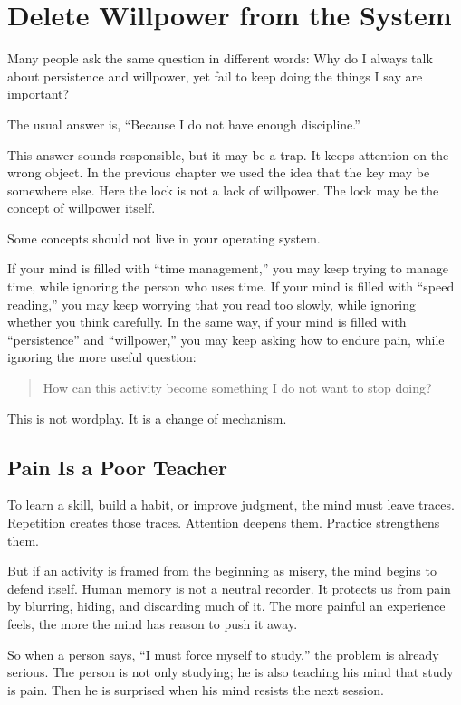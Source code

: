 \chapter{Delete Willpower from the System}

Many people ask the same question in different words: Why do I always talk about persistence and willpower, yet fail to keep doing the things I say are important?

The usual answer is, ``Because I do not have enough discipline.''

This answer sounds responsible, but it may be a trap. It keeps attention on the wrong object. In the previous chapter we used the idea that the key may be somewhere else. Here the lock is not a lack of willpower. The lock may be the concept of willpower itself.

Some concepts should not live in your operating system.

If your mind is filled with ``time management,'' you may keep trying to manage time, while ignoring the person who uses time. If your mind is filled with ``speed reading,'' you may keep worrying that you read too slowly, while ignoring whether you think carefully. In the same way, if your mind is filled with ``persistence'' and ``willpower,'' you may keep asking how to endure pain, while ignoring the more useful question:

\begin{quote}
How can this activity become something I do not want to stop doing?
\end{quote}

This is not wordplay. It is a change of mechanism.

\section*{Pain Is a Poor Teacher}

To learn a skill, build a habit, or improve judgment, the mind must leave traces. Repetition creates those traces. Attention deepens them. Practice strengthens them.

But if an activity is framed from the beginning as misery, the mind begins to defend itself. Human memory is not a neutral recorder. It protects us from pain by blurring, hiding, and discarding much of it. The more painful an experience feels, the more the mind has reason to push it away.

So when a person says, ``I must force myself to study,'' the problem is already serious. The person is not only studying; he is also teaching his mind that study is pain. Then he is surprised when his mind resists the next session.

